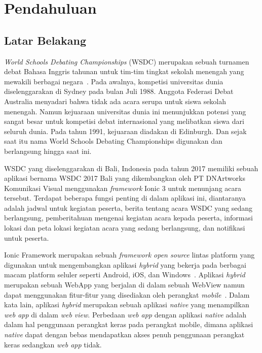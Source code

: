 \chapter{Pendahuluan}
\label{chap:intro}
   
\section{Latar Belakang}
\label{sec:label}

\textit{World Schools Debating Championships} (WSDC) merupakan sebuah turnamen debat Bahasa Inggris tahunan untuk tim-tim tingkat sekolah menengah yang mewakili berbagai negara~\cite{wsdc}. Pada awalnya, kompetisi universitas dunia diselenggarakan di Sydney pada bulan Juli 1988. Anggota Federasi Debat Australia menyadari bahwa tidak ada acara serupa untuk siswa sekolah menengah. Namun kejuaraan universitas dunia ini menunjukkan potensi yang sangat besar untuk kompetisi debat internasional yang melibatkan siswa dari seluruh dunia. Pada tahun 1991, kejuaraan diadakan di Edinburgh. Dan sejak saat itu nama World Schools Debating Championships digunakan dan berlangsung hingga saat ini. 

WSDC yang diselenggarakan di Bali, Indonesia pada tahun 2017 memiliki sebuah aplikasi bernama WSDC 2017 Bali yang dikembangkan oleh PT DNArtworks Komunikasi Visual menggunakan \textit{framework} Ionic 3 untuk menunjang acara tersebut. Terdapat beberapa fungsi penting di dalam aplikasi ini, diantaranya adalah jadwal untuk kegiatan peserta, berita tentang acara WSDC yang sedang berlangsung, pemberitahuan mengenai kegiatan acara kepada peserta, informasi lokasi dan peta lokasi kegiatan acara yang sedang berlangsung, dan notifikasi untuk peserta. 

Ionic Framework merupakan sebuah {\it framework open source} lintas platform yang digunakan untuk mengembangkan aplikasi \textit{hybrid} yang bekerja pada berbagai macam platform seluler seperti Android, iOS, dan Windows~\cite{waranashiwar:18:ionic}. Aplikasi \textit{hybrid} merupakan sebuah WebApp yang berjalan di dalam sebuah WebView namun dapat menggunakan fitur-fitur yang disediakan oleh perangkat \textit{mobile}~\cite{yusuf:16:ionic}. Dalam kata lain, aplikasi \textit{hybrid} merupakan sebuah aplikasi \textit{native} yang menampilkan \textit{web app} di dalam \textit{web view}. Perbedaan \textit{web app} dengan aplikasi \textit{native} adalah dalam hal penggunaan perangkat keras pada perangkat mobile, dimana aplikasi \textit{native} dapat dengan bebas mendapatkan akses penuh penggunaan perangkat keras sedangkan \textit{web app} tidak.


